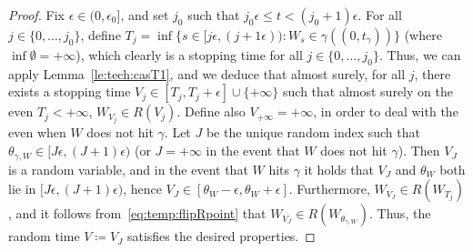 \documentclass[11pt]{article}
\newtheorem{lemma}[theorem]{Lemma}
\DeclareMathOperator{\Range}{Range}
\begin{document}
\begin{proof}
    Fix $\epsilon\in(0, \epsilon_0]$, and set $j_0$ such that $j_0\epsilon\leq t <(j_0+1)\epsilon$. For all $j\in \{0,\dots, j_0\}$, define $T_j= \inf \{ s\in [j\epsilon, (j+1\epsilon)): W_s\in \gamma((0,t_\gamma))\}$ (where $\inf \emptyset=+\infty$), which clearly is a stopping time for all $j\in \{0,\dots, j_0\}$. Thus, we can apply Lemma~\ref{le:tech:casT1}, and we deduce that almost surely, for all $j$, there exists a stopping time  $V_j\in [T_j,T_j+\epsilon]\cup \{+\infty\}$ such that almost surely on the even $T_j<+\infty$, $W_{V_j}\in  R(V_j)$. Define also $V_{+\infty}=+\infty$, in order to deal with the even when $W$ does not hit $\gamma$. Let $J$ be the unique random index such that
    $\theta_{\gamma,W}\in [J\epsilon,(J+1)\epsilon)$ (or $J=+\infty$ in the event that $W$ does not hit $\gamma$). Then $V_{J}$ is a random variable, and in the event
    that $W$ hits $\gamma$ it holds that $V_{J}$ and $\theta_W $ both lie in $[J\epsilon , (J+1)\epsilon) $, hence $V_J \in [\theta_W-\epsilon,\theta_W+\epsilon] $. Furthermore,  $W_{V_J}\in  R( W_{T_j}  )$, and it follows from~\eqref{eq:temp:flipRpoint} that $W_{V_J}\in R(W_{\theta_{\gamma,W}})$.
    Thus, the random  time $V\coloneqq V_J$ satisfies the desired properties.
\end{proof}

\end{document}

